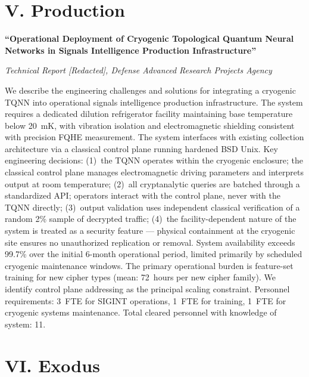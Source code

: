 \vspace{1cm}

\section*{V. Production}
\label{appendix:production}

\textbf{``Operational Deployment of Cryogenic Topological Quantum Neural Networks in Signals Intelligence Production Infrastructure''}

\textit{Technical Report [Redacted], Defense Advanced Research Projects Agency}

\vspace{0.3cm}

We describe the engineering challenges and solutions for integrating a cryogenic TQNN into operational signals intelligence production infrastructure. The system requires a dedicated dilution refrigerator facility maintaining base temperature below 20~mK, with vibration isolation and electromagnetic shielding consistent with precision FQHE measurement. The system interfaces with existing collection architecture via a classical control plane running hardened BSD Unix. Key engineering decisions: (1)~the TQNN operates within the cryogenic enclosure; the classical control plane manages electromagnetic driving parameters and interprets output at room temperature; (2)~all cryptanalytic queries are batched through a standardized API; operators interact with the control plane, never with the TQNN directly; (3)~output validation uses independent classical verification of a random 2\% sample of decrypted traffic; (4)~the facility-dependent nature of the system is treated as a security feature --- physical containment at the cryogenic site ensures no unauthorized replication or removal. System availability exceeds 99.7\% over the initial 6-month operational period, limited primarily by scheduled cryogenic maintenance windows. The primary operational burden is feature-set training for new cipher types (mean: 72~hours per new cipher family). We identify control plane addressing as the principal scaling constraint. Personnel requirements: 3~FTE for SIGINT operations, 1~FTE for training, 1~FTE for cryogenic systems maintenance. Total cleared personnel with knowledge of system: 11.

\vspace{1cm}

\section*{VI. Exodus}
\label{appendix:exodus}


